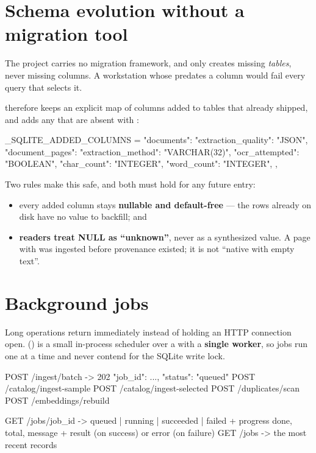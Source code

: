 \section{Schema evolution without a migration tool}
\label{sec:schema-evolution}

The project carries no migration framework, and  only creates
missing \emph{tables}, never missing columns. A workstation whose
 predates a column would fail every query that selects it.

 therefore keeps an explicit map of columns added to
tables that already shipped, and  adds any that are absent with
:

\begin{pyblock}
_SQLITE_ADDED_COLUMNS = {
    "documents": {"extraction_quality": "JSON"},
    "document_pages": {
        "extraction_method": "VARCHAR(32)",
        "ocr_attempted": "BOOLEAN",
        "char_count": "INTEGER",
        "word_count": "INTEGER",
    },
}
\end{pyblock}

Two rules make this safe, and both must hold for any future entry:

\begin{itemize}
\item every added column stays \textbf{nullable and default-free} --- the rows
already on disk have no value to backfill; and
\item \textbf{readers treat NULL as ``unknown''}, never as a synthesized value.
A page with  was ingested before provenance
existed; it is not ``native with empty text''.
\end{itemize}

\section{Background jobs}

Long operations return immediately instead of holding an HTTP connection open.
 () is a small in-process
scheduler over a  with a \textbf{single worker}, so jobs
run one at a time and never contend for the SQLite write lock.

\begin{shellblock}
POST /ingest/batch        -> 202 {"job_id": ..., "status": "queued"}
POST /catalog/ingest-sample
POST /catalog/ingest-selected
POST /duplicates/scan
POST /embeddings/rebuild

GET  /jobs/{job_id}       -> queued | running | succeeded | failed
                             + progress {done, total, message}
                             + result (on success) or error (on failure)
GET  /jobs                -> the most recent records
\end{shellblock}

